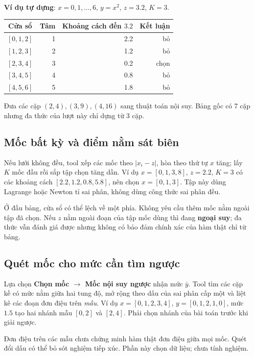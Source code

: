 \textbf{Ví dụ tự dựng}: $x=0,1,\ldots,6$, $y=x^2$, $z=3.2$, $K=3$.
\begin{center}\small
\begin{tabular}{@{}crrr@{}}\toprule
Cửa sổ & Tâm & Khoảng cách đến $3.2$ & Kết luận\\\midrule
$[0,1,2]$ & 1 & 2.2 & bỏ\\
$[1,2,3]$ & 2 & 1.2 & bỏ\\
$[2,3,4]$ & 3 & 0.2 & chọn\\
$[3,4,5]$ & 4 & 0.8 & bỏ\\
$[4,5,6]$ & 5 & 1.8 & bỏ\\\bottomrule
\end{tabular}\end{center}
Đưa các cặp $(2,4),(3,9),(4,16)$ sang thuật toán nội suy. Bảng gốc có 7 cặp nhưng đa thức của lượt này chỉ dựng từ 3 cặp.

\subsection{Mốc bất kỳ và điểm nằm sát biên}
Nếu lưới không đều, tool xếp các mốc theo $|x_i-z|$, hòa theo thứ tự $x$ tăng; lấy $K$ mốc đầu rồi sắp tập chọn tăng dần. Ví dụ $x=[0,1,3,8]$, $z=2.2$, $K=3$ có các khoảng cách $[2.2,1.2,0.8,5.8]$, nên chọn $x=[0,1,3]$. Tập này dùng Lagrange hoặc Newton tỉ sai phân, không dùng công thức sai phân đều.

Ở đầu bảng, cửa sổ có thể lệch về một phía. Không yêu cầu thêm mốc nằm ngoài tập đã chọn. Nếu $z$ nằm ngoài đoạn của tập mốc dùng thì đang \textbf{ngoại suy}; đa thức vẫn đánh giá được nhưng không có bảo đảm chính xác của hàm thật chỉ từ bảng.

\subsection{Quét mốc cho mức cần tìm ngược}
Lựa chọn \textbf{Chọn mốc $\to$ Mốc nội suy ngược} nhận mức $\bar y$. Tool tìm các cặp kề có mức nằm giữa hai tung độ, mở rộng theo dấu của sai phân cấp một và liệt kê các đoạn đơn điệu trên \emph{mẫu}. Ví dụ $x=[0,1,2,3,4]$, $y=[0,1,2,1,0]$, mức $1.5$ tạo hai nhánh mẫu $[0,2]$ và $[2,4]$. Phải chọn nhánh của bài toán trước khi giải ngược.

Đơn điệu trên các mẫu chưa chứng minh hàm thật đơn điệu giữa mọi mốc. Quét đổi dấu có thể bỏ sót nghiệm tiếp xúc. Phần này chọn dữ liệu; chưa tính nghiệm.

